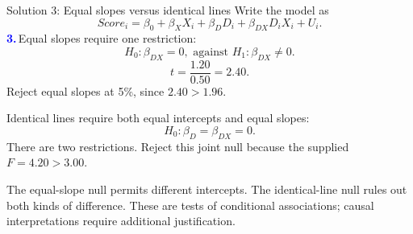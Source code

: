 \documentclass[notes,10pt, aspectratio=169]{beamer}
\newcommand{\answerpart}[1]{\textcolor{blue}{\textbf{#1.}}\,}
\begin{document}
\begin{frame}{Solution 3: Equal slopes versus identical lines}
\small
Write the model as
\[
Score_i=\beta_0+\beta_X X_i+\beta_D D_i+\beta_{DX}D_iX_i+U_i.
\]
\answerpart{3}Equal slopes require one restriction:
\[
H_0:\beta_{DX}=0,\text{ against }H_1:\beta_{DX}\ne0.
\]
\[
t=\frac{1.20}{0.50}=2.40.
\]
Reject equal slopes at 5\%, since $2.40>1.96$.
\par\medskip
Identical lines require both equal intercepts and equal slopes:
\[
H_0:\beta_D=\beta_{DX}=0.
\]
There are two restrictions. Reject this joint null because the supplied $F=4.20>3.00$.
\par\smallskip
The equal-slope null permits different intercepts. The identical-line null rules out both kinds of difference. These are tests of conditional associations; causal interpretations require additional justification.
\end{frame}
\fi
\end{document}
